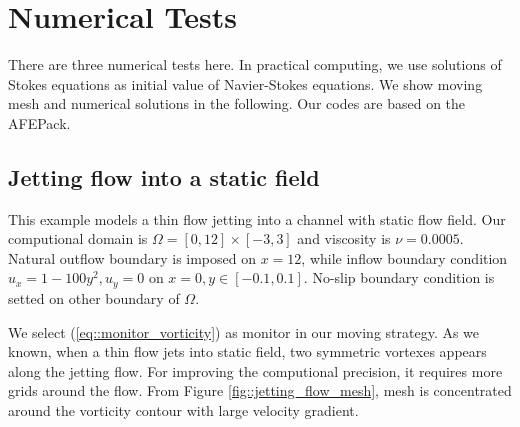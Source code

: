 \documentclass[a4paper, 11pt]{article}
\begin{document}
\section{Numerical Tests}
     There are three numerical tests here. In practical computing, 
     we use solutions of Stokes equations as initial value of
     Navier-Stokes equations.  We show moving mesh and numerical
     solutions in the following. Our codes are based on the AFEPack.

     \subsection{Jetting flow into a static field}
       This example models a thin flow jetting into a channel with
       static flow field.  
       Our computional domain is $\Omega = [0, 12] \times [-3, 3]$ and
       viscosity is $\nu = 0.0005$.
       Natural outflow boundary is imposed on $x = 12$, while inflow
       boundary condition $u_x = 1 - 100 y^2, u_y = 0$ on $x = 0, y
       \in [-0.1, 0.1]$. No-slip boundary condition is setted on
       other boundary of $\Omega$. 
       
       We select (\ref{eq::monitor_vorticity}) as monitor in our
       moving strategy. As we known, when a thin flow jets into static
       field, two symmetric vortexes appears along the jetting flow.
       For improving the computional precision, it requires more grids
       around the flow. From Figure \ref{fig::jetting_flow_mesh}, mesh 
       is concentrated around the vorticity contour with large
       velocity gradient.
\end{document}
